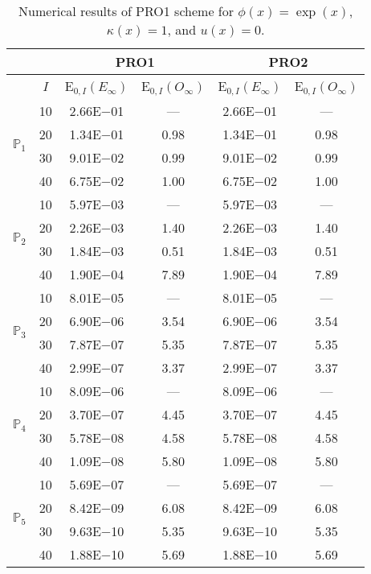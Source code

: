 \begin{table}[H]
\caption{Numerical results of PRO1 scheme for $\phi(x)=\exp(x)$, $\kappa(x)=1$, and $u(x)=0$.}
\setlength{\tabcolsep}{5pt}
\centering
\begin{tabular}{@{}l c c c c c@{}}
\toprule
 &  & \multicolumn{2}{c}{PRO1} & \multicolumn{2}{c}{PRO2}\\
\midrule
 & $I$ & E$_{0,I}(E_{\infty})$ & E$_{0,I}(O_{\infty})$ & E$_{0,I}(E_{\infty})$ & E$_{0,I}(O_{\infty})$\\
\midrule
\multirow{4}{*}{$\mathbb{P}_{1}$}
 & 10 & 2.66E$-$01 & --- & 2.66E$-$01 & ---\\
 & 20 & 1.34E$-$01 & 0.98 & 1.34E$-$01 & 0.98 \\
 & 30 & 9.01E$-$02 & 0.99 & 9.01E$-$02 & 0.99 \\
 & 40 & 6.75E$-$02 & 1.00 & 6.75E$-$02 & 1.00 \\
\midrule
\multirow{4}{*}{$\mathbb{P}_{2}$}
 & 10 & 5.97E$-$03 & --- & 5.97E$-$03 & ---\\
 & 20 & 2.26E$-$03 & 1.40 & 2.26E$-$03 & 1.40 \\
 & 30 & 1.84E$-$03 & 0.51 & 1.84E$-$03 & 0.51 \\
 & 40 & 1.90E$-$04 & 7.89 & 1.90E$-$04 & 7.89 \\
\midrule
\multirow{4}{*}{$\mathbb{P}_{3}$}
 & 10 & 8.01E$-$05 & --- & 8.01E$-$05 & ---\\
 & 20 & 6.90E$-$06 & 3.54 & 6.90E$-$06 & 3.54 \\
 & 30 & 7.87E$-$07 & 5.35 & 7.87E$-$07 & 5.35 \\
 & 40 & 2.99E$-$07 & 3.37 & 2.99E$-$07 & 3.37 \\
\midrule
\multirow{4}{*}{$\mathbb{P}_{4}$}
 & 10 & 8.09E$-$06 & --- & 8.09E$-$06 & ---\\
 & 20 & 3.70E$-$07 & 4.45 & 3.70E$-$07 & 4.45 \\
 & 30 & 5.78E$-$08 & 4.58 & 5.78E$-$08 & 4.58 \\
 & 40 & 1.09E$-$08 & 5.80 & 1.09E$-$08 & 5.80 \\
\midrule
\multirow{4}{*}{$\mathbb{P}_{5}$}
 & 10 & 5.69E$-$07 & --- & 5.69E$-$07 & ---\\
 & 20 & 8.42E$-$09 & 6.08 & 8.42E$-$09 & 6.08 \\
 & 30 & 9.63E$-$10 & 5.35 & 9.63E$-$10 & 5.35 \\
 & 40 & 1.88E$-$10 & 5.69 & 1.88E$-$10 & 5.69 \\
\bottomrule
\end{tabular}
\label{Table:PRO:Test1}
\end{table}
